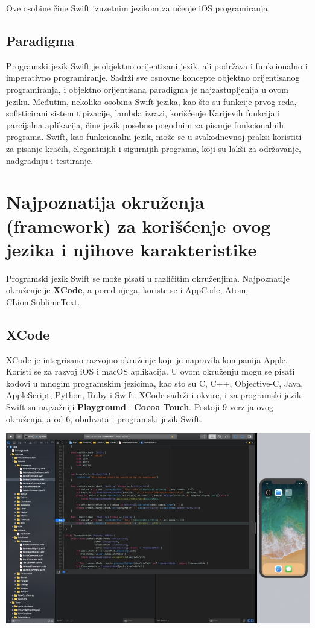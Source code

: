 \documentclass[a4paper]{article}
\begin{document}
Ove osobine čine Swift izuzetnim jezikom za učenje iOS programiranja.

\subsection{Paradigma}
\label{subsec:podnaslovParadigma}

Programski jezik Swift je objektno orijentisani jezik, ali podržava i funkcionalno i imperativno
programiranje. Sadrži sve osnovne koncepte objektno orijentisanog programiranja, i objektno orijentisana paradigma je najzastupljenija u ovom jeziku. Međutim, nekoliko osobina Swift jezika, kao što su funkcije prvog reda, sofisticirani sistem tipizacije, lambda izrazi, korišćenje Karijevih funkcija i parcijalna aplikacija, čine jezik posebno pogodnim za pisanje funkcionalnih programa. Swift, kao funkcionalni jezik, može se u svakodnevnoj praksi koristiti za pisanje kraćih, elegantnijih i sigurnijih programa, koji su lakši za održavanje, nadgradnju i testiranje.




\section{Najpoznatija okruženja (framework) za korišćenje ovog jezika i njihove karakteristike}	
\label{sec:cetvrtiDeo}

Programski jezik Swift se može pisati u različitim okruženjima. Najpoznatije okruženje je \textbf{XCode}, a pored njega, koriste se i AppCode, Atom, CLion,SublimeText.

\subsection{XCode}
\label{subsec:podnaslovXCode}



XCode je integrisano razvojno okruženje koje je napravila kompanija Apple. Koristi se za razvoj iOS i macOS aplikacija. U ovom okruženju mogu se pisati kodovi u mnogim programskim jezicima, kao sto su C, C++, Objective-C, Java, AppleScript, Python, Ruby i Swift. XCode sadrži i okvire, i za programski jezik Swift su najvažniji \textbf{Playground} i \textbf{Cocoa Touch}. 
Postoji 9 verzija ovog okruženja, a od 6, obuhvata i programski jezik Swift.
\vspace{5mm}


\includegraphics[scale=0.2]{xcode.jpg}
\end{document}
